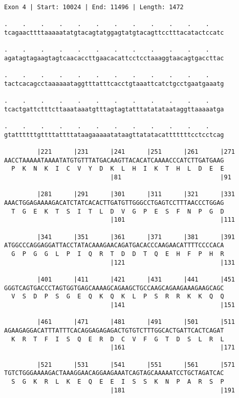 \documentclass{article}
\begin{document}
\begin{Verbatim}
Exon 4 | Start: 10024 | End: 11496 | Length: 1472
 
.    .    .    .    .    .    .    .    .    .    .    .    
tcagaacttttaaaaatatgtacagtatggagtatgtacagttcctttacatactccatc
  
.    .    .    .    .    .    .    .    .    .    .    .    
agatagtagaagtagtcaacaccttgaacacattcctcctaaaggtaacagtgaccttac
  
.    .    .    .    .    .    .    .    .    .    .    .    
tactcacagcctaaaaaataggtttatttcacctgtaaattcatctgcctgaatgaaatg
  
.    .    .    .    .    .    .    .    .    .    .    .    
tcactgattctttcttaaataaatgtttagtagtatttatatataataggttaaaaatga
  
.    .    .    .    .    .    .    .    .    .    .    .    
gtattttttgttttattttataagaaaaatataagttatatacatttttttcctcctcag
  
         |221      |231      |241      |251      |261      |271
AACCTAAAAATAAAATATGTGTTTATGACAAGTTACACATCAAAACCCATCTTGATGAAG
  P  K  N  K  I  C  V  Y  D  K  L  H  I  K  T  H  L  D  E  E
                             |81                           |91
  
         |281      |291      |301      |311      |321      |331
AAACTGGAGAAAAGACATCTATCACACTTGATGTTGGGCCTGAGTCCTTTAACCCTGGAG
  T  G  E  K  T  S  I  T  L  D  V  G  P  E  S  F  N  P  G  D
                             |101                          |111
  
         |341      |351      |361      |371      |381      |391
ATGGCCCAGGAGGATTACCTATACAAAGAACAGATGACACCCAAGAACATTTTCCCCACA
  G  P  G  G  L  P  I  Q  R  T  D  D  T  Q  E  H  F  P  H  R
                             |121                          |131
  
         |401      |411      |421      |431      |441      |451
GGGTCAGTGACCCTAGTGGTGAGCAAAAGCAGAAGCTGCCAAGCAGAAGAAAGAAGCAGC
  V  S  D  P  S  G  E  Q  K  Q  K  L  P  S  R  R  K  K  Q  Q
                             |141                          |151
  
         |461      |471      |481      |491      |501      |511
AGAAGAGGACATTTATTTCACAGGAGAGAGACTGTGTCTTTGGCACTGATTCACTCAGAT
  K  R  T  F  I  S  Q  E  R  D  C  V  F  G  T  D  S  L  R  L
                             |161                          |171
  
         |521      |531      |541      |551      |561      |571
TGTCTGGGAAAAGACTAAAGGAACAGGAAGAAATCAGTAGCAAAAATCCTGCTAGATCAC
  S  G  K  R  L  K  E  Q  E  E  I  S  S  K  N  P  A  R  S  P
                             |181                          |191
  

\end{Verbatim}
\end{document}
